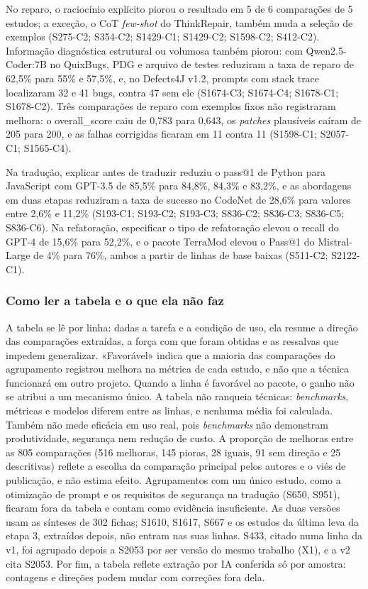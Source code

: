 No reparo, o raciocínio explícito piorou o resultado em 5 de 6 comparações de 5
estudos; a exceção, o CoT \textit{few-shot} do ThinkRepair, também muda a seleção de exemplos
(S275-C2; S354-C2; S1429-C1; S1429-C2; S1598-C2; S412-C2).
Informação diagnóstica estrutural ou volumosa também piorou: com Qwen2.5-Coder:7B no
QuixBugs, PDG e arquivo de testes reduziram a taxa de reparo de 62,5\% para 55\% e
57,5\%, e, no Defects4J v1.2, prompts com stack trace localizaram 32 e 41 bugs, contra 47
sem ele (S1674-C3; S1674-C4; S1678-C1; S1678-C2).
Três comparações de reparo com exemplos fixos não registraram melhora: o
overall\_score caiu de 0,783 para 0,643, os \textit{patches} plausíveis caíram de 205 para 200, e
as falhas corrigidas ficaram em 11 contra 11 (S1598-C1; S2057-C1; S1565-C4).

Na tradução, explicar antes de traduzir reduziu o pass@1 de Python para JavaScript com
GPT-3.5 de 85,5\% para 84,8\%, 84,3\% e 83,2\%, e as abordagens em duas etapas reduziram
a taxa de sucesso no CodeNet de 28,6\% para valores entre 2,6\% e 11,2\% (S193-C1;
S193-C2; S193-C3; S836-C2; S836-C3; S836-C5; S836-C6).
Na refatoração, especificar o tipo de refatoração elevou o recall do GPT-4 de 15,6\% para
52,2\%, e o pacote TerraMod elevou o Pass@1 do Mistral-Large de 4\% para 76\%, ambos a
partir de linhas de base baixas (S511-C2; S2122-C1).



\subsubsection{Como ler a tabela e o que ela não faz}

A tabela se lê por linha: dadas a tarefa e a condição de uso, ela resume a direção das
comparações extraídas, a força com que foram obtidas e as ressalvas que impedem
generalizar. «Favorável» indica que a maioria das comparações do agrupamento registrou
melhora na métrica de cada estudo, e não que a técnica funcionará em outro projeto.
Quando a linha é favorável ao pacote, o ganho não se atribui a um mecanismo único. A
tabela não ranqueia técnicas: \textit{benchmarks}, métricas e modelos diferem entre as linhas, e
nenhuma média foi calculada. Também não mede eficácia em uso real, pois \textit{benchmarks} não
demonstram produtividade, segurança nem redução de custo. A proporção de melhoras entre
as 805 comparações (516 melhoras, 145 pioras, 28 iguais, 91 sem direção e 25
descritivas) reflete a escolha da comparação principal pelos autores e o viés de
publicação, e não estima efeito. Agrupamentos com um único estudo, como a otimização de
prompt e os requisitos de segurança na tradução (S650, S951), ficaram fora da tabela e
contam como evidência insuficiente. As duas versões usam as sínteses de 302 fichas; S1610, S1617, S667 e os estudos da última
leva da etapa 3, extraídos depois, não entram nas suas linhas. S433, citado numa linha da v1, foi agrupado depois
a S2053 por ser versão do mesmo trabalho (X1), e a v2 cita S2053. Por fim, a tabela reflete extração por IA conferida só por
amostra: contagens e direções podem mudar com correções fora dela.
